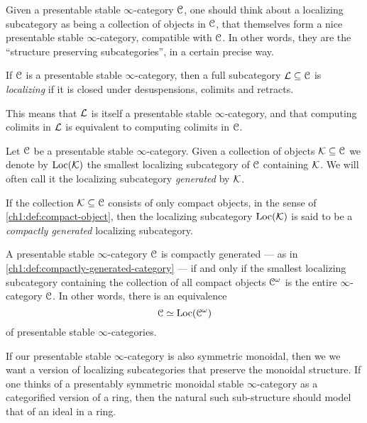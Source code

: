 Given a presentable stable $\infty$-category $\EuScript{C}$, one should think about a localizing subcategory as being a collection of objects in $\EuScript{C}$, that themselves form a nice presentable stable $\infty$-category, compatible with $\EuScript{C}$. In other words, they are the ``structure preserving subcategories'', in a certain precise way. 

\begin{definition}
    \label{ch1:def:localizing-subcategory}
    If $\EuScript{C}$ is a presentable stable $\infty$-category, then a full subcategory $\mathcal{L}\subseteq \EuScript{C}$ is \emph{localizing} if it is closed under desuspensions, colimits and retracts. 
\end{definition}

This means that $\mathcal{L}$ is itself a presentable stable $\infty$-category, and that computing colimits in $\mathcal{L}$ is equivalent to computing colimits in $\EuScript{C}$. 

\begin{definition}
    Let $\EuScript{C}$ be a presentable stable $\infty$-category. Given a collection of objects $\mathcal{K}\subseteq \EuScript{C}$ we denote by $\operatorname{Loc}(\mathcal{K})$ the smallest localizing subcategory of $\EuScript{C}$ containing $\mathcal{K}$. We will often call it the localizing subcategory \emph{generated} by $\mathcal{K}$. 
\end{definition}

\begin{remark}
    \label{ch1:rm:compactly-generated-localizing-subcategory}
    If the collection $\mathcal{K} \subseteq \EuScript{C}$ consists of only compact objects, in the sense of \cref{ch1:def:compact-object}, then the localizing subcategory $\operatorname{Loc}(\mathcal{K})$ is said to be a \emph{compactly generated} localizing subcategory. 
\end{remark}

A presentable stable $\infty$-category $\EuScript{C}$ is compactly generated --- as in \cref{ch1:def:compactly-generated-category} --- if and only if the smallest localizing subcategory containing the collection of all compact objects $\EuScript{C}^\omega$ is the entire $\infty$-category $\EuScript{C}$. In other words, there is an equivalence  
\[\EuScript{C}\simeq \operatorname{Loc}(\EuScript{C}^\omega)\]
of presentable stable $\infty$-categories. 




If our presentable stable $\infty$-category is also symmetric monoidal, then we we want a version of localizing subcategories that preserve the monoidal structure. If one thinks of a presentably symmetric monoidal stable $\infty$-category as a categorified version of a ring, then the natural such sub-structure should model that of an ideal in a ring. 


